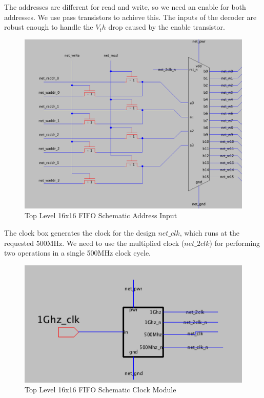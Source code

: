 \documentclass[a4paper]{article}
\begin{document}
The addresses are different for read and write, so we need an enable for both addresses. We use pass transistors to achieve this. The inputs of the decoder are robust enough to handle the $V_th$ drop caused by the enable transistor.

\begin{figure}[H]
	\centering
	\includegraphics[scale=0.3]{topLevelSchematicLeft}
	\caption{Top Level 16x16 FIFO Schematic Address Input}
	\label{fig:topLevelSchematicLeft}
\end{figure}

The clock box generates the clock for the design $net\_clk$, which runs at the requested 500MHz. We need to use the multiplied clock ($net\_2clk$) for performing two operations in a single 500MHz clock cycle. 

\begin{figure}[H]
	\centering
	\includegraphics[scale=0.65]{topLevelSchematicClockBox}
	\caption{Top Level 16x16 FIFO Schematic Clock Module}
	\label{fig:topLevelSchematicClockBox}
\end{figure}
\end{document}
